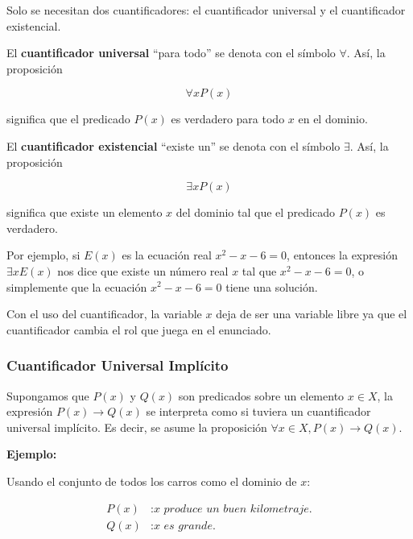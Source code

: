 Solo se necesitan dos cuantificadores: el cuantificador universal y el cuantificador existencial. 

El \textbf{cuantificador universal} ``para todo'' se denota con el símbolo $\forall$. Así, la proposición

\begin{equation*}
    \forall{x} P(x)
\end{equation*}

significa que el predicado $P(x)$ es verdadero para todo $x$ en el dominio.

El \textbf{cuantificador existencial} ``existe un'' se denota con el símbolo $\exists$. Así, la proposición

\begin{equation*}
    \exists{x} P(x)
\end{equation*}

significa que existe un elemento $x$ del dominio tal que el predicado $P(x)$ es verdadero.

Por ejemplo, si $E(x)$ es la ecuación real $x^2-x-6=0$, entonces la expresión $\exists{x}E(x)$ nos dice que existe un número real $x$ tal que $x^2-x-6=0$, o simplemente que la ecuación $x^2-x-6=0$ tiene una solución.

Con el uso del cuantificador, la variable $x$ deja de ser una variable libre ya que el cuantificador cambia el rol que juega en el enunciado.

\subsubsection{Cuantificador Universal Implícito}

Supongamos que $P(x)$ y $Q(x)$ son predicados sobre un elemento $x \in X$, la expresión $P(x) \rightarrow Q(x)$ se interpreta como si tuviera un cuantificador universal implícito. Es decir, se asume la proposición $\forall x \in X, P(x) \rightarrow Q(x)$.

\textbf{Ejemplo:}

Usando el conjunto de todos los carros como el dominio de $x$: 

\begin{equation*}
    \begin{split}
        P(x) &: \textit{x produce un buen kilometraje.} \\
        Q(x) &: \textit{x es grande.} \\
    \end{split}
\end{equation*}

